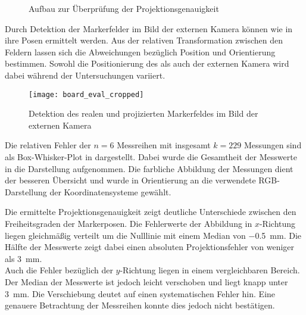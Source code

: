 \begin{figure}[ht]
	\begin{center}%
		\caption{Aufbau zur Überprüfung der Projektionsgenauigkeit}
		\label{fig.projsetup}
	\end{center}
\end{figure}

Durch Detektion der Markerfelder im Bild der externen Kamera können wie in  ihre Posen ermittelt werden. Aus der relativen Transformation zwischen den Feldern lassen sich die Abweichungen bezüglich Position und Orientierung bestimmen. Sowohl die Positionierung des  als auch der externen Kamera wird dabei während der Untersuchungen variiert.\\

\begin{figure}[!ht]
	\begin{center}
		\texttt{[image: board\_eval\_cropped]}
		\caption{Detektion des realen und projizierten Markerfeldes im Bild der externen Kamera}
		\label{fig.arprojected}
	\end{center}
\end{figure}

Die relativen Fehler der $n=6$ Messreihen mit insgesamt $k=229$ Messungen sind als Box-Whisker-Plot in  dargestellt. Dabei wurde die Gesamtheit der Messwerte in die Darstellung aufgenommen. Die farbliche Abbildung der Messungen dient der besseren Übersicht und wurde in Orientierung an die verwendete RGB-Darstellung der Koordinatensysteme gewählt.



Die ermittelte Projektionsgenauigkeit zeigt deutliche Unterschiede zwischen den Freiheitsgraden der Markerposen. Die Fehlerwerte der Abbildung in $x$-Richtung liegen gleichmäßig verteilt um die Nulllinie mit einem Median von \SI{-0.5}{\milli\meter}. Die Hälfte der Messwerte zeigt dabei einen absoluten Projektionsfehler von weniger als \SI{3}{\milli\meter}.\\
Auch die Fehler bezüglich der $y$-Richtung liegen in einem vergleichbaren Bereich. Der Median der Messwerte ist jedoch leicht verschoben und liegt knapp unter \SI{3}{\milli\meter}. Die Verschiebung deutet auf einen systematischen Fehler hin. Eine genauere Betrachtung der Messreihen konnte dies jedoch nicht bestätigen.\\

